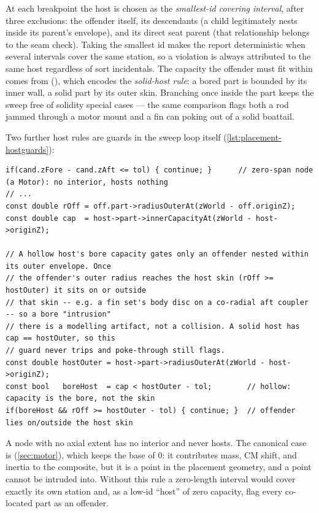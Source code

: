 At each breakpoint the host is chosen as the \emph{smallest-id covering interval}, after three
exclusions: the offender itself, its descendants (a child legitimately nests inside its parent's
envelope), and its direct seat parent (that relationship belongs to the seam check). Taking the
smallest id makes the report deterministic when several intervals cover the same station, so a
violation is always attributed to the same host regardless of sort incidentals. The capacity the
offender must fit within comes from 
(), which encodes the \emph{solid-host rule}: a bored part is
bounded by its inner wall, a solid part by its outer skin. Branching once inside the part keeps the
sweep free of solidity special cases --- the same comparison flags both a rod jammed through a
motor mount and a fin can poking out of a solid boattail.

Two further host rules are guards in the sweep loop itself (\cref{lst:placement-hostguards}):

\begin{listing}[htbp]
\begin{verbatim}
if(cand.zFore - cand.zAft <= tol) { continue; }      // zero-span node (a Motor): no interior, hosts nothing
// ...
const double rOff = off.part->radiusOuterAt(zWorld - off.originZ);
const double cap  = host->part->innerCapacityAt(zWorld - host->originZ);

// A hollow host's bore capacity gates only an offender nested within its outer envelope. Once
// the offender's outer radius reaches the host skin (rOff >= hostOuter) it sits on or outside
// that skin -- e.g. a fin set's body disc on a co-radial aft coupler -- so a bore "intrusion"
// there is a modelling artifact, not a collision. A solid host has cap == hostOuter, so this
// guard never trips and poke-through still flags.
const double hostOuter = host->part->radiusOuterAt(zWorld - host->originZ);
const bool   boreHost  = cap < hostOuter - tol;        // hollow: capacity is the bore, not the skin
if(boreHost && rOff >= hostOuter - tol) { continue; }  // offender lies on/outside the host skin
\end{verbatim}
\caption{The zero-span-host rule and the bore-host skin guard inside the sweep
(, elided).}\label{lst:placement-hostguards}
\end{listing}

\begin{designrule}
A node with no axial extent has no interior and never hosts. The canonical case is 
(\cref{sec:motor}), which keeps the base  of $0$: it contributes mass, CM shift,
and inertia to the composite, but it is a point in the placement geometry, and a point cannot be
intruded into. Without this rule a zero-length interval would cover exactly its own station and, as
a low-id ``host'' of zero capacity, flag every co-located part as an offender.
\end{designrule}

